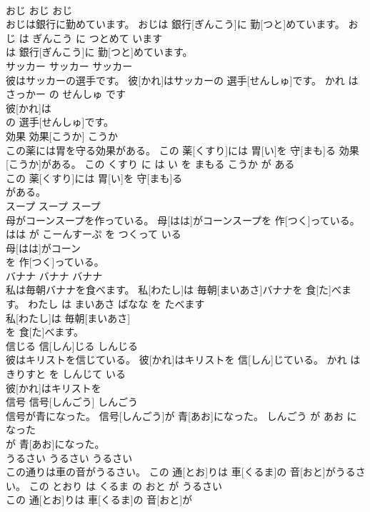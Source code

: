 \documentclass[8pt]{extreport}
\begin{document}
\begin{CJK}{UTF8}{min}
\\	おじ	おじ	おじ	
\\	おじは銀行に勤めています。	おじは 銀行[ぎんこう]に 勤[つと]めています。	おじ は ぎんこう に つとめて います	
\\	は 銀行[ぎんこう]に 勤[つと]めています。			
\\	サッカー	サッカー	サッカー	
\\	彼はサッカーの選手です。	彼[かれ]はサッカーの 選手[せんしゅ]です。	かれ は さっかー の せんしゅ です	
\\	彼[かれ]は
\\	の 選手[せんしゅ]です。			
\\	効果	効果[こうか]	こうか	
\\	この薬には胃を守る効果がある。	この 薬[くすり]には 胃[い]を 守[まも]る 効果[こうか]がある。	この くすり に は い を まもる こうか が ある	
\\	この 薬[くすり]には 胃[い]を 守[まも]る
\\	がある。			
\\	スープ	スープ	スープ	
\\	母がコーンスープを作っている。	母[はは]がコーンスープを 作[つく]っている。	はは が こーんすーぷ を つくって いる	
\\	母[はは]がコーン
\\	を 作[つく]っている。			
\\	バナナ	バナナ	バナナ	
\\	私は毎朝バナナを食べます。	私[わたし]は 毎朝[まいあさ]バナナを 食[た]べます。	わたし は まいあさ ばなな を たべます	
\\	私[わたし]は 毎朝[まいあさ]
\\	を 食[た]べます。			
\\	信じる	信[しん]じる	しんじる	
\\	彼はキリストを信じている。	彼[かれ]はキリストを 信[しん]じている。	かれ は きりすと を しんじて いる	
\\	彼[かれ]はキリストを
\\	信号	信号[しんごう]	しんごう	
\\	信号が青になった。	信号[しんごう]が 青[あお]になった。	しんごう が あお に なった	
\\	が 青[あお]になった。			
\\	うるさい	うるさい	うるさい	
\\	この通りは車の音がうるさい。	この 通[とお]りは 車[くるま]の 音[おと]がうるさい。	この とおり は くるま の おと が うるさい	
\\	この 通[とお]りは 車[くるま]の 音[おと]が

\end{CJK}
\end{document}
